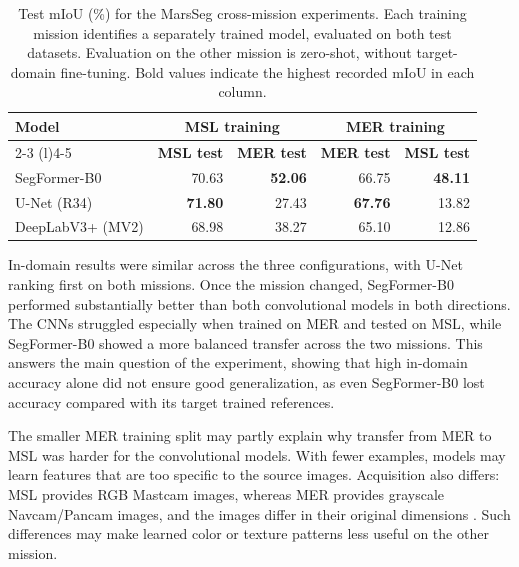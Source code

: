 \begin{table}[ht!]
    \centering
    \small
    \setlength{\tabcolsep}{5pt}
    \begin{tabular}{@{}l r r r r@{}}
        \toprule
        \textbf{Model}                            &
        \multicolumn{2}{c}{\textbf{MSL training}} &
        \multicolumn{2}{c}{\textbf{MER training}}                                                                                 \\
        \cmidrule(lr){2-3}
        \cmidrule(l){4-5}
                                                  & \textbf{MSL test} & \textbf{MER test} & \textbf{MER test} & \textbf{MSL test} \\
        \midrule
        \midrule
        SegFormer-B0                              & 70.63             & \textbf{52.06}    & 66.75             & \textbf{48.11}    \\
        U-Net (R34)                          & \textbf{71.80}    & 27.43             & \textbf{67.76}    & 13.82             \\
        DeepLabV3+ (MV2)                  & 68.98             & 38.27             & 65.10             & 12.86             \\
        \bottomrule
    \end{tabular}
    \vspace{5mm}
    \caption{Test mIoU (\%) for the MarsSeg cross-mission experiments. Each training mission identifies a separately trained model, evaluated on both test datasets. Evaluation on the other mission is zero-shot, without target-domain fine-tuning. Bold values indicate the highest recorded mIoU in each column.}
    \label{tab:marsseg-cross-mission-accuracy}
\end{table}

In-domain results were similar across the three configurations, with U-Net ranking first on both missions. Once the mission changed, SegFormer-B0 performed substantially better than both convolutional models in both directions. The CNNs struggled especially when trained on MER and tested on MSL, while SegFormer-B0 showed a more balanced transfer across the two missions. This answers the main question of the experiment, showing that high in-domain accuracy alone did not ensure good generalization, as even SegFormer-B0 lost accuracy compared with its target trained references.

The smaller MER training split may partly explain why transfer from MER to MSL was harder for the convolutional models. With fewer examples, models may learn features that are too specific to the source images. Acquisition also differs: MSL provides RGB Mastcam images, whereas MER provides grayscale Navcam/Pancam images, and the images differ in their original dimensions \cite{purohit2025marsbench}. Such differences may make learned color or texture patterns less useful on the other mission.

